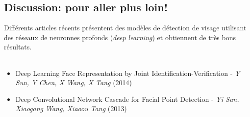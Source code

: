 \documentclass{article}
\begin{document}
\subsection{Discussion: pour aller plus loin!}
Différents articles récents présentent des modèles de détection de visage utilisant des réseaux de neuronnes profonds (\emph{deep learning}) et obtiennent de très bons résultats. \\

\\
\begin{itemize}
    \item Deep Learning Face Representation by Joint Identification-Verification - \textit{Y Sun, Y Chen, X Wang, X Tang} (2014)
    \item Deep Convolutional Network Cascade for Facial Point Detection - \textit{Yi Sun, Xiaogang Wang, Xiaoou Tang} (2013)
\end{itemize}
\end{document}
